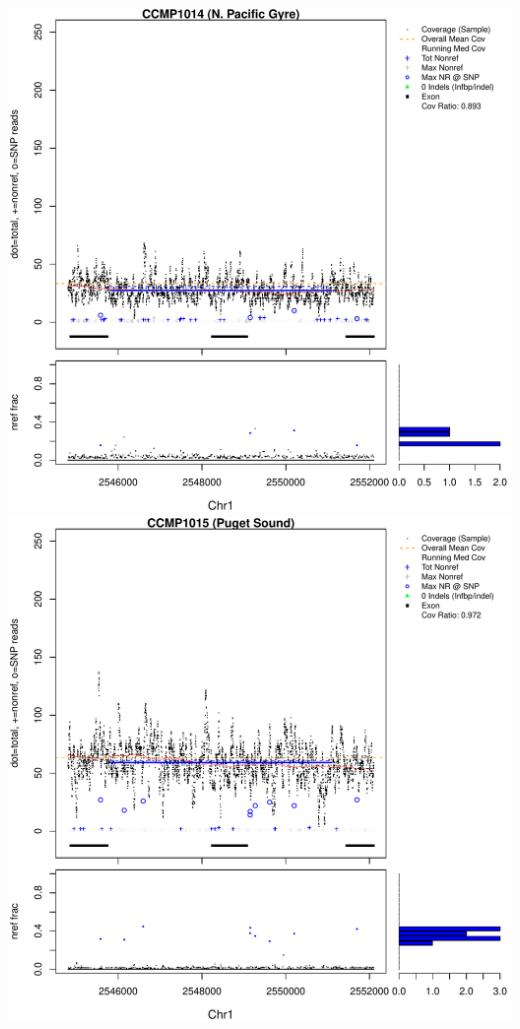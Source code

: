 \documentclass{article}\usepackage[]{graphicx}\usepackage[]{color}
\makeatletter
\def\maxwidth{ %
  \ifdim\Gin@nat@width>\linewidth
    \linewidth
  \else
    \Gin@nat@width
  \fi
}
\newenvironment{knitrout}{}{} %
\makeatother
\begin{document}
\begin{knitrout}
{\includegraphics[width=\maxwidth]{figs-knitr/unnamed-chunk-49-5} 
\includegraphics[width=\maxwidth]{figs-knitr/unnamed-chunk-49-6} 
}
\end{knitrout}
\end{document}

